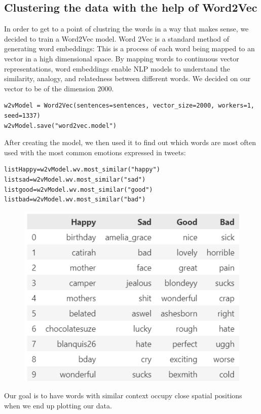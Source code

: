 \documentclass[11pt,a4paper]{article}
\begin{document}
\subsection{Clustering the data with the help of Word2Vec}
In order to get to a point of clustring the words in a way that makes sense, we decided to train a Word2Vec model. Word 2Vec is a standard method of generating word embeddings: This is a process of each word being mapped to an vector in a high dimensional space. By mapping words to continuous vector representations, word embeddings enable NLP models to understand the similarity, analogy, and relatedness between different words\cite{cluster}\cite{gensimword2vec}. We decided on our vector to be of the dimension 2000.  
\begin{lstlisting}
w2vModel = Word2Vec(sentences=sentences, vector_size=2000, workers=1, seed=1337)
w2vModel.save("word2vec.model")
\end{lstlisting}
After creating the model, we then used it to find out which words are most often used with the most common emotions expressed in tweets:
\begin{lstlisting}
listHappy=w2vModel.wv.most_similar("happy")
listsad=w2vModel.wv.most_similar("sad")
listgood=w2vModel.wv.most_similar("good")
listbad=w2vModel.wv.most_similar("bad")
\end{lstlisting}
\begin{figure}[h]
\includegraphics[scale=0.6]{emotionwords}
\centering
\end{figure}
Our goal is to have words with similar context occupy close spatial positions when we end up plotting our data. 
\end{document}
